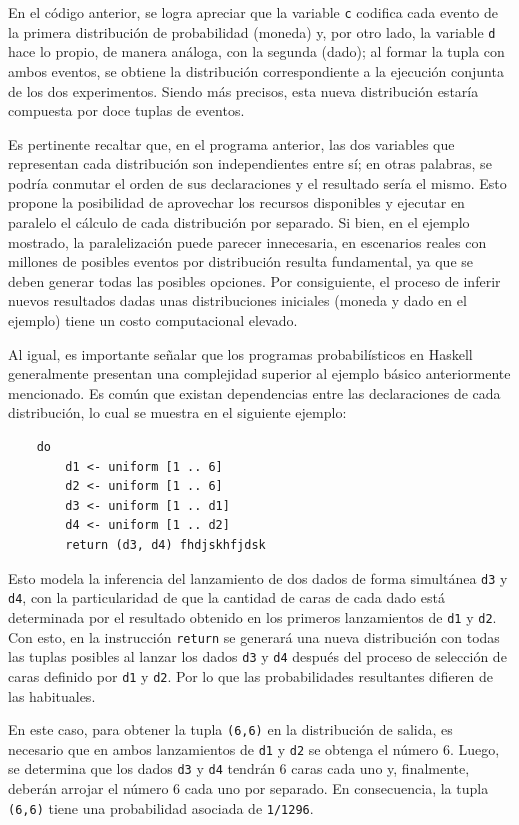 En el código anterior, se logra apreciar que la variable \verb|c| codifica cada evento de la primera distribución de probabilidad (moneda) y, por otro lado, la variable \verb|d| hace lo propio, de manera análoga, con la segunda (dado); al formar la tupla con ambos eventos, se obtiene la distribución correspondiente a la ejecución conjunta de los dos experimentos. Siendo más precisos, esta nueva distribución estaría compuesta por doce tuplas de eventos.

Es pertinente recaltar que, en el programa anterior, las dos variables que representan cada distribución son independientes entre sí; en otras palabras, se podría conmutar el orden de sus declaraciones y el resultado sería el mismo. Esto propone la posibilidad de aprovechar los recursos disponibles y ejecutar en paralelo el cálculo de cada distribución por separado. Si bien, en el ejemplo mostrado, la paralelización puede parecer innecesaria, en escenarios reales con millones de posibles eventos por distribución resulta fundamental, ya que se deben generar todas las posibles opciones. Por consiguiente, el proceso de inferir nuevos resultados dadas unas distribuciones iniciales (moneda y dado en el ejemplo) tiene un costo computacional elevado.

Al igual, es importante señalar que los programas probabilísticos en \textsf{Haskell} generalmente presentan una complejidad superior al ejemplo básico anteriormente mencionado. Es común que existan dependencias entre las declaraciones de cada distribución, lo cual se muestra en el siguiente ejemplo:

\begin{verbatim}
    do
        d1 <- uniform [1 .. 6]
        d2 <- uniform [1 .. 6]
        d3 <- uniform [1 .. d1]
        d4 <- uniform [1 .. d2]
        return (d3, d4) fhdjskhfjdsk
\end{verbatim}

Esto modela la inferencia del lanzamiento de dos dados de forma simultánea \verb|d3| y \verb|d4|, con la particularidad de que la cantidad de caras de cada dado está determinada por el resultado obtenido en los primeros lanzamientos de \verb|d1| y \verb|d2|. Con esto, en la instrucción \verb|return| se generará una nueva distribución con todas las tuplas posibles al lanzar los dados \verb|d3| y \verb|d4| después del proceso de selección de caras definido por \verb|d1| y \verb|d2|. Por lo que las probabilidades resultantes difieren de las habituales.

En este caso, para obtener la tupla \verb|(6,6)| en la distribución de salida, es necesario que en ambos lanzamientos de \verb|d1| y \verb|d2| se obtenga el número 6. Luego, se determina que los dados \verb|d3| y \verb|d4| tendrán 6 caras cada uno y, finalmente, deberán arrojar el número 6 cada uno por separado. En consecuencia, la tupla \verb|(6,6)| tiene una probabilidad asociada de \verb|1/1296|.

